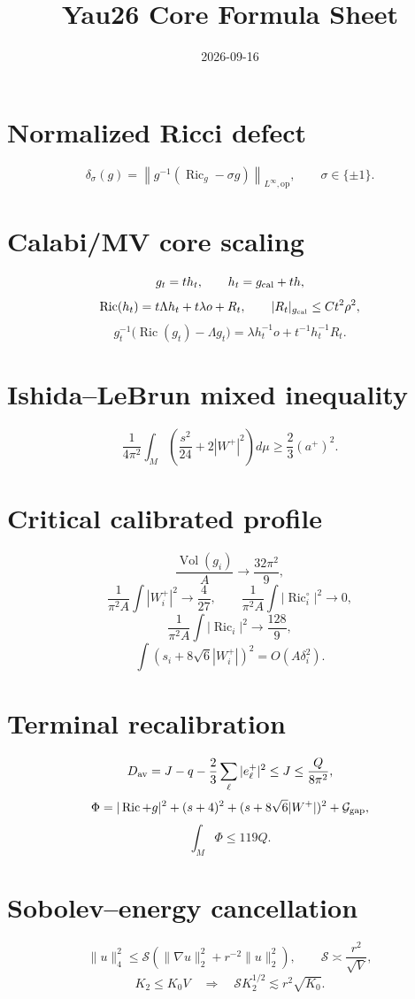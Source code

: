 \documentclass[11pt]{article}
\title{Yau26 Core Formula Sheet}
\date{2026-09-16}
\begin{document}
\maketitle

\section*{Normalized Ricci defect}
\[
\delta_\sigma(g)=
\left\|g^{-1}(\operatorname{Ric}_g-\sigma g)\right\|_{L^\infty,\mathrm{op}},
\qquad \sigma\in\{\pm1\}.
\]

\section*{Calabi/MV core scaling}
\[
g_t=t h_t,\qquad h_t=g_{\rm cal}+th,
\]
\[
\operatorname{Ric}(h_t)
=t\Lambda h_t+t\lambda o+R_t,
\qquad |R_t|_{g_{\rm cal}}\le Ct^2\rho^2,
\]
\[
g_t^{-1}\bigl(\operatorname{Ric}(g_t)-\Lambda g_t\bigr)
=
\lambda h_t^{-1}o+t^{-1}h_t^{-1}R_t.
\]

\section*{Ishida--LeBrun mixed inequality}
\[
\frac1{4\pi^2}\int_M
\left(\frac{s^2}{24}+2|W^+|^2\right)d\mu
\ge\frac23(a^+)^2.
\]

\section*{Critical calibrated profile}
\[
\frac{\operatorname{Vol}(g_i)}{A}\to\frac{32\pi^2}{9},
\]
\[
\frac1{\pi^2A}\int|W_i^+|^2\to\frac4{27},
\qquad
\frac1{\pi^2A}\int|\operatorname{Ric}_i^\circ|^2\to0,
\]
\[
\frac1{\pi^2A}\int|\operatorname{Ric}_i|^2\to\frac{128}{9},
\]
\[
\int(s_i+8\sqrt6|W_i^+|)^2=O(A\delta_i^2).
\]

\section*{Terminal recalibration}
\[
D_{\rm av}
=
J-q-\frac23\sum_\ell|e_\ell^+|^2
\le J\le\frac{Q}{8\pi^2},
\]
\[
\Phi=
|\operatorname{Ric}+g|^2+(s+4)^2
+(s+8\sqrt6|W^+|)^2+\mathcal G_{\rm gap},
\]
\[
\int_M\Phi\le119Q.
\]

\section*{Sobolev--energy cancellation}
\[
\|u\|_4^2
\le
\mathcal S(\|\nabla u\|_2^2+r^{-2}\|u\|_2^2),
\qquad
\mathcal S\asymp\frac{r^2}{\sqrt V},
\]
\[
K_2\le K_0V
\quad\Longrightarrow\quad
\mathcal S K_2^{1/2}\lesssim r^2\sqrt{K_0}.
\]
\end{document}

